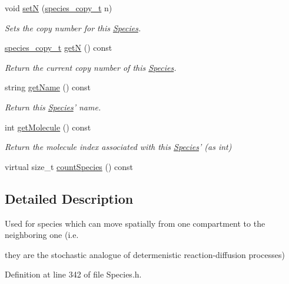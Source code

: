 \begin{DoxyCompactItemize}
void \hyperlink{classSpecies_a88de7cf5130cb9cee2da3585374db654}{set\+N} (\hyperlink{common_8h_a3503f321fd36304ee274141275cca586}{species\+\_\+copy\+\_\+t} n)
\begin{DoxyCompactList}\small\item\em Sets the copy number for this \hyperlink{classSpecies}{Species}. \end{DoxyCompactList}\item 
\hyperlink{common_8h_a3503f321fd36304ee274141275cca586}{species\+\_\+copy\+\_\+t} \hyperlink{classSpecies_aea7327b3fed261c705b4d32b9973aa58}{get\+N} () const 
\begin{DoxyCompactList}\small\item\em Return the current copy number of this \hyperlink{classSpecies}{Species}. \end{DoxyCompactList}\item 
string \hyperlink{classSpecies_a28fa239dded841133760ff9c47af63a1}{get\+Name} () const 
\begin{DoxyCompactList}\small\item\em Return this \hyperlink{classSpecies}{Species}' name. \end{DoxyCompactList}\item 
int \hyperlink{classSpecies_a1ea8969c51bc69879891a408f9e197c7}{get\+Molecule} () const 
\begin{DoxyCompactList}\small\item\em Return the molecule index associated with this \hyperlink{classSpecies}{Species}' (as int) \end{DoxyCompactList}\item 
virtual size\+\_\+t \hyperlink{classSpecies_a1864e111fe0304ca8d6b2d0d955a7356}{count\+Species} () const 
\end{DoxyCompactItemize}


\subsection{Detailed Description}
Used for species which can move spatially from one compartment to the neighboring one (i.\+e. 

they are the stochastic analogue of determenistic reaction-\/diffusion processes) 

Definition at line 342 of file Species.\+h.



